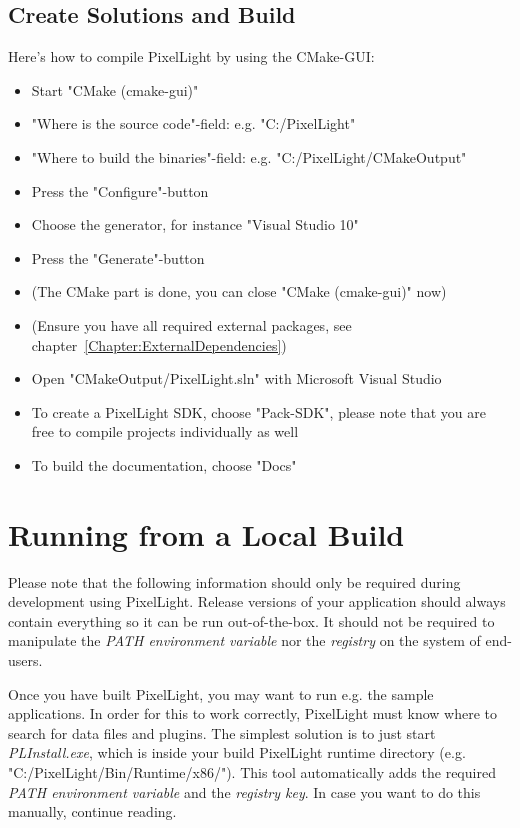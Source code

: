 \subsection{Create Solutions and Build}
Here's how to compile PixelLight by using the CMake-\ac{GUI}:
\begin{itemize}
\item{Start "CMake (cmake-gui)"}
\item{"Where is the source code"-field: e.g. "C:/PixelLight"}
\item{"Where to build the binaries"-field: e.g. "C:/PixelLight/CMakeOutput"}
\item{Press the "Configure"-button}
\item{Choose the generator, for instance "Visual Studio 10"}
\item{Press the "Generate"-button}
\item{(The CMake part is done, you can close "CMake (cmake-gui)" now)}
\item{(Ensure you have all required external packages, see chapter~\ref{Chapter:ExternalDependencies})}
\item{Open "CMakeOutput/PixelLight.sln" with Microsoft Visual Studio}
\item{To create a PixelLight \ac{SDK}, choose "Pack-SDK", please note that you are free to compile projects individually as well}
\item{To build the documentation, choose "Docs"}
\end{itemize}




\section{Running from a Local Build}
Please note that the following information should only be required during development using PixelLight. Release versions of your application should always contain everything so it can be run out-of-the-box. It should not be required to manipulate the \emph{PATH environment variable} nor the \emph{registry} on the system of end-users.

Once you have built PixelLight, you may want to run e.g. the sample applications. In order for this to work correctly, PixelLight must know where to search for data files and plugins. The simplest solution is to just start \emph{PLInstall.exe}, which is inside your build PixelLight runtime directory (e.g. "C:/PixelLight/Bin/Runtime/x86/"). This tool automatically adds the required \emph{PATH environment variable} and the \emph{registry key}. In case you want to do this manually, continue reading.


